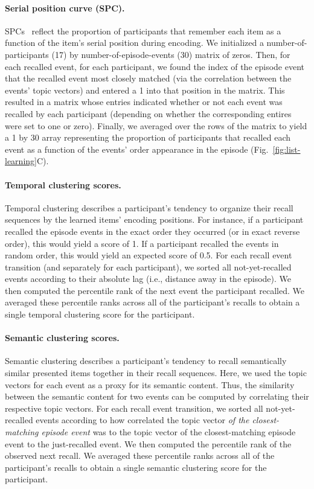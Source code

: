 \documentclass[10pt]{article}
\begin{document}
\paragraph{Serial position curve (SPC).} SPCs~\citep{Murd62a} reflect the proportion of participants that remember each item as a function of the item's serial position during encoding. We initialized a number-of-participants (17) by number-of-episode-events (30) matrix of zeros. Then, for each recalled event, for each participant, we found the index of the episode event that the recalled event most closely matched (via the correlation between the events' topic vectors) and entered a 1 into that position in the matrix. This resulted in a matrix whose entries indicated whether or not each event was recalled by each participant (depending on whether the corresponding entires were set to one or zero).  Finally, we averaged over the rows of the matrix to yield a 1 by 30 array representing the proportion of participants that recalled each event as a function of the events' order appearance in the episode (Fig.~\ref{fig:list-learning}C).

\paragraph{Temporal clustering scores.} Temporal clustering describes a participant's tendency to organize their recall sequences by the learned items' encoding positions.  For instance, if a participant recalled the episode events in the exact order they occurred (or in exact reverse order), this would yield a score of 1.  If a participant recalled the events in random order, this would yield an expected score of 0.5.  For each recall event transition (and separately for each participant), we sorted all not-yet-recalled events according to their absolute lag (i.e., distance away in the episode).  We then computed the percentile rank of the next event the participant recalled.  We averaged these percentile ranks across all of the participant's recalls to obtain a single temporal clustering score for the participant.

\paragraph{Semantic clustering scores.} Semantic clustering describes a participant's tendency to recall semantically similar presented items together in their recall sequences.  Here, we used the topic vectors for each event as a proxy for its semantic content. Thus, the similarity between the semantic content for two events can be computed by correlating their respective topic vectors.  For each recall event transition, we sorted all not-yet-recalled events according to how correlated the topic vector \textit{of the closest-matching episode event} was to the topic vector of the closest-matching episode event to the just-recalled event.  We then computed the percentile rank of the observed next recall.  We averaged these percentile ranks across all of the participant's recalls to obtain a single semantic clustering score for the participant.
\end{document}
